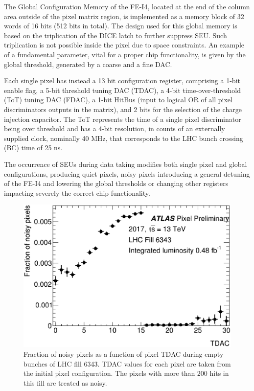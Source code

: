 The Global Configuration Memory of the FE-I4, located at the end of the column area outside of the pixel matrix region, is implemented as a memory block of 32 words of 16 bits (512 bits in total). The design used for this global memory is based on the triplication of the DICE latch to further suppress SEU. Such triplication is not possible inside the pixel due to space constraints. An example of a fundamental parameter, vital for a proper chip functionality, is given by the global threshold, generated by a coarse and a fine DAC. 

Each single pixel has instead a 13 bit configuration register, comprising a 1-bit enable flag, a 5-bit threshold tuning DAC (TDAC), a 4-bit time-over-threshold (ToT) tuning DAC (FDAC), a 1-bit HitBus (input to logical OR of all pixel discriminators outputs in the matrix), and 2 bits for the selection of the charge injection capacitor.
The ToT represents the time of a single pixel discriminator being over threshold and has a 4-bit resolution, in counts of an externally supplied clock, nominally 40 MHz, that corresponds to the LHC bunch crossing (BC) time of 25 ns.


The occurrence of SEUs during data taking modifies both single pixel and global configurations, producing quiet pixels, noisy pixels introducing a general detuning of the FE-I4 and lowering the global thresholds or changing other registers impacting severely the correct chip functionality.

\begin{figure}[h]
\centering
\includegraphics[width=0.5\linewidth]{figures/ElectronicsChapter/ATLAS/noiseVSTDAC_fill6343.eps}
\caption{Fraction of noisy pixels as a function of pixel TDAC during empty bunches of LHC fill 6343. TDAC values for each pixel are taken from the initial pixel configuration. The pixels with more than 200 hits in this fill are treated as noisy.}
\label{fig:noiseVSTDAC}
\end{figure}

